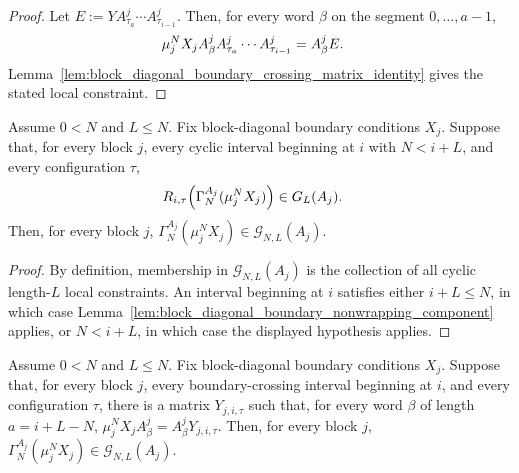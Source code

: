 \begin{proof}
    \leanok
    Let $E:=Y A^j_{\tau_a}\cdots A^j_{\tau_{i-1}}$. Then, for every word
    $\beta$ on the segment $0,\ldots,a-1$,
    \begin{align}
        \mu_j^N X_j A^j_\beta
        A^j_{\tau_a}\cdots A^j_{\tau_{i-1}}
         & =
        A^j_\beta E.
        \notag
    \end{align}
    Lemma~\ref{lem:block_diagonal_boundary_crossing_matrix_identity} gives the
    stated local constraint.
\end{proof}

\begin{lemma}
    \label{lem:block_diagonal_boundary_component_crossing_windows_suffice}
    \leanok
    Assume $0<N$ and $L\le N$. Fix block-diagonal boundary conditions
    $X_j$. Suppose that, for every block $j$, every cyclic interval beginning
    at $i$ with $N<i+L$, and every configuration $\tau$,
    \begin{align}
        R_{i,\tau}\!\left(\Gamma_N^{A_j}(\mu_j^NX_j)\right)
         & \in
        G_L(A_j).
        \notag
    \end{align}
    Then, for every block $j$,
    $\Gamma_N^{A_j}(\mu_j^NX_j) \in \mathcal G_{N,L}(A_j)$.
\end{lemma}

\begin{proof}
    \leanok
    By definition, membership in $\mathcal G_{N,L}(A_j)$ is the collection of
    all cyclic length-$L$ local constraints. An interval beginning at $i$
    satisfies either $i+L\le N$, in which case
    Lemma~\ref{lem:block_diagonal_boundary_nonwrapping_component} applies, or
    $N<i+L$, in which case the displayed hypothesis applies.
\end{proof}

\begin{lemma}
    \label{lem:block_diagonal_boundary_component_right_boundary_matrices}
    \leanok
    Assume $0<N$ and $L\le N$. Fix block-diagonal boundary conditions
    $X_j$. Suppose that, for every block $j$, every boundary-crossing
    interval beginning at $i$, and every configuration $\tau$, there is a
    matrix $Y_{j,i,\tau}$ such that, for every word $\beta$ of length
    $a=i+L-N$,
    $\mu_j^N X_j A^j_\beta = A^j_\beta Y_{j,i,\tau}$.
    Then, for every block $j$,
    $\Gamma_N^{A_j}(\mu_j^NX_j) \in \mathcal G_{N,L}(A_j)$.
\end{lemma}

